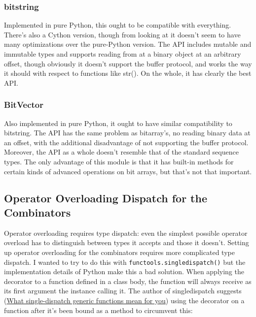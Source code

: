 \documentclass[12pt]{article}
\begin{document}
\subsubsection{bitstring}
\label{sec:bitstring}

Implemented in pure Python, this ought to be compatible with
everything.  There's also a Cython version, though from looking at it
doesn't seem to have many optimizations over the pure-Python version.
The API includes mutable and immutable types and supports reading from
at a binary object at an arbitrary offset, though obviously it doesn't
support the buffer protocol, and works the way it should with respect
to functions like str().  On the whole, it has clearly the best API.

\subsubsection{BitVector}
\label{sec:bitvector}

Also implemented in pure Python, it ought to have similar
compatibility to bitstring.  The API has the same problem as
bitarray's, no reading binary data at an offset, with the additional
disadvantage of not supporting the buffer protocol.  Moreover, the API
as a whole doesn't resemble that of the standard sequence types.  The
only advantage of this module is that it has built-in methods for
certain kinds of advanced operations on bit arrays, but that's not
that important.


\subsection{Operator Overloading Dispatch for the Combinators}
\label{sec:operator_overloading_dispatch_combinators}

Operator overloading requires type dispatch: even the simplest
possible operator overload has to distinguish between types it accepts
and those it doesn't.  Setting up operator overloading for the
combinators requires more complicated type dispatch.  I wanted to try
to do this with \texttt{functools.singledispatch()} but the
implementation details of Python make this a bad solution.  When
applying the decorator to a function defined in a class body, the
function will always receive as its first argument the instance
calling it.  The author of singledispatch suggests
(\href{http://lukasz.langa.pl/8/single-dispatch-generic-functions/}{What
  single-dispatch generic functions mean for you}) using the decorator
on a function after it's been bound as a method to circumvent this:
\end{document}
